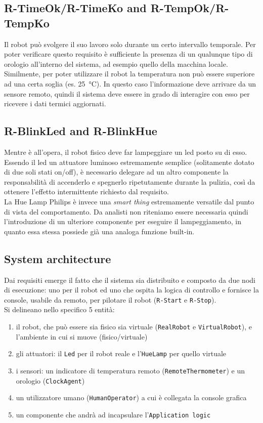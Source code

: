 \documentclass{../llncs}
\newcommand{\code}[1]{{\color{blue}\small{\texttt{#1}}}}
\begin{document}
\subsection{R-TimeOk/R-TimeKo and R-TempOk/R-TempKo}
Il robot può svolgere il suo lavoro solo durante un certo intervallo temporale. Per poter verificare questo requisito è sufficiente la presenza di un qualunque tipo di orologio all'interno del sistema, ad esempio quello della macchina locale.\\

Similmente, per poter utilizzare il robot la temperatura non può essere superiore ad una certa soglia (es. \SI{25}{\celsius}). In questo caso l'informazione deve arrivare da un sensore remoto, quindi il sistema deve essere in grado di interagire con esso per ricevere i dati termici aggiornati.

\subsection{R-BlinkLed and R-BlinkHue}
Mentre è all'opera, il robot fisico deve far lampeggiare un led posto su di esso. Essendo il led un attuatore luminoso estremamente semplice (solitamente dotato di due soli stati on/off), è necessario delegare ad un altro componente la responsabilità di accenderlo e spegnerlo ripetutamente durante la pulizia, così da ottenere l'effetto intermittente richiesto dal requisito.\\

La Hue Lamp Philips è invece una \emph{smart thing} estremamente versatile dal punto di vista del comportamento.
Da analisti non riteniamo essere necessaria quindi l'introduzione di un ulteriore componente per eseguire il lampeggiamento, in quanto essa stessa possiede già una analoga funzione built-in.

\subsection{System architecture}
Dai requisiti emerge il fatto che il sistema sia distribuito e composto da due nodi di esecuzione: uno per il robot ed uno che ospita la logica di controllo e fornisce la console, usabile da remoto, per pilotare il robot (\code{R-Start} e \code{R-Stop}).\\

\noindent Si delineano nello specifico 5 entità:
\begin{enumerate}
\item il robot, che può essere sia fisico sia virtuale (\texttt{RealRobot} e \texttt{VirtualRobot}), e l'ambiente in cui si muove (fisico/virtuale)
\item gli attuatori: il \texttt{Led} per il robot reale e l'\texttt{HueLamp} per quello virtuale
\item i sensori: un indicatore di temperatura remoto (\texttt{RemoteThermometer}) e un orologio (\texttt{ClockAgent})
\item un utilizzatore umano (\texttt{HumanOperator}) a cui è collegata la console grafica
\item un componente che andrà ad incapsulare l'\texttt{Application logic}
\end{enumerate}
\end{document}
